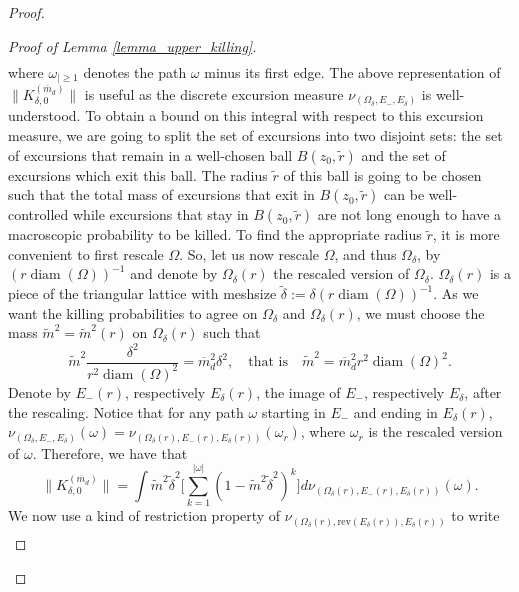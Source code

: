 \documentclass{article}
\theoremstyle{definition}
\theoremstyle{remark}
\theoremstyle{remark}
\begin{document}
\begin{proof}
\begin{proof}[Proof of Lemma \ref{lemma_upper_killing}]
\begin{align*}
\end{align*}
where $\omega_{\vert \geq 1}$ denotes the path $\omega$ minus its first edge. The above representation of $\| K_{\delta, 0}^{(\overline{m}_d)} \|$ is useful as the discrete excursion measure $\nu_{(\Omega_{\delta}, E_{-}, E_{\delta})}$ is well-understood. To obtain a bound on this integral with respect to this excursion measure, we are going to split the set of excursions into two disjoint sets: the set of excursions that remain in a well-chosen ball $B(z_0, \tilde r)$ and the set of excursions which exit this ball. The radius $\tilde r$ of this ball is going to be chosen such that the total mass of excursions that exit in $B(z_0, \tilde r)$ can be well-controlled while excursions that stay in $B(z_0, \tilde r)$ are not long enough to have a macroscopic probability to be killed. To find the appropriate radius $\tilde r$, it is more convenient to first rescale $\Omega$. So, let us now rescale $\Omega$, and thus $\Omega_{\delta}$, by $(r\operatorname{diam}(\Omega))^{-1}$ and denote by $\Omega_{\delta}(r)$ the rescaled version of $\Omega_{\delta}$. $\Omega_{\delta}(r)$ is a piece of the triangular lattice with meshsize $\tilde \delta := \delta(r\operatorname{diam}(\Omega))^{-1}$. As we want the killing probabilities to agree on $\Omega_{\delta}$ and $\Omega_{\delta}(r)$, we must choose the mass $\tilde m^2 = \tilde m^2(r)$ on $\Omega_{\delta}(r)$ such that
\begin{equation*}
    \tilde m^2 \frac{\delta^2}{r^2\operatorname{diam}(\Omega)^2} = \overline{m}_d^2 \delta^2, \quad \text{that is} \quad \tilde m^2= \overline{m}_d^2r^2\operatorname{diam}(\Omega)^2.
\end{equation*}
Denote by $E_{-}(r)$, respectively $E_{\delta}(r)$, the image of $E_{-}$, respectively $E_{\delta}$, after the rescaling. Notice that for any path $\omega$ starting in $E_{-}$ and ending in $E_{\delta}(r)$, $\nu_{(\Omega_{\delta}, E_{-}, E_{\delta})}(\omega) = \nu_{(\Omega_{\delta}(r), E_{-}(r), E_{\delta}(r))}(\omega_r)$, where $\omega_r$  is the rescaled version of $\omega$. Therefore, we have that
\begin{equation*}
    \| K_{\delta, 0}^{(\overline{m}_d)} \| = \int \tilde {m}^{2} \tilde \delta^2 \bigg[ \sum_{k=1}^{\vert \omega \vert } (1-\tilde{m}^2 \tilde \delta^2)^k \bigg] d\nu_{(\Omega_{\delta}(r), E_{-}(r), E_{\delta}(r))}(\omega).
\end{equation*}
We now use a kind of restriction property of $\nu_{(\Omega_{\delta}(r), \text{rev}(E_{\delta}(r)), E_{\delta}(r))}$ to write
\begin{align*}

\end{align*}
\end{proof}
\end{proof}
\end{document}
